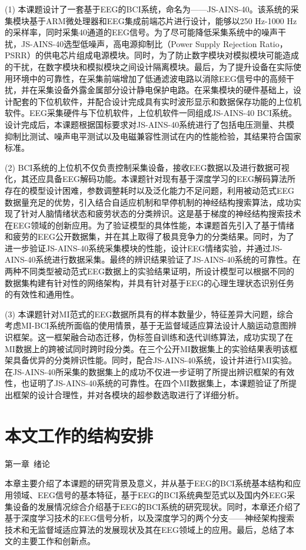 (1) 本课题设计了一套基于EEG的BCI系统，命名为——JS-AINS-40。该系统的采集模块基于ARM微处理器和EEG集成前端芯片进行设计，能够以250 Hz-1000 Hz的采样率，同时采集40通道的EEG信号。为了尽可能降低采集系统中的噪声干扰，JS-AINS-40选型低噪声，高电源抑制比（Power Supply Rejection Ratio，PSRR）的供电芯片组成电源模块。同时，为了防止数字模块对模拟模块可能造成的干扰，在数字模块和模拟模块之间设计隔离模块。最后，为了提升设备在实际使用环境中的可靠性，在采集前端增加了低通滤波电路以消除EEG信号中的高频干扰，并在采集设备外露金属部分设计静电保护电路。在采集模块的硬件基础上，设计配套的下位机软件，并配合设计完成具有实时波形显示和数据保存功能的上位机软件。EEG采集硬件与下位机软件，上位机软件一同组成JS-AINS-40 BCI系统。设计完成后，本课题根据国标要求对JS-AINS-40系统进行了包括电压测量、共模抑制比测试、噪声电平测试以及电磁兼容性测试在内的性能检验，其结果符合国家标准。

(2) BCI系统的上位机不仅负责控制采集设备，接收EEG数据以及进行数据可视化，其还应具备EEG解码功能。本课题针对现有基于深度学习的EEG解码算法所存在的模型设计困难，参数调整耗时以及泛化能力不足问题，利用被动范式EEG数据量充足的优势，引入结合自适应机制和早停机制的神经结构搜索算法，成功实现了针对人脑情绪状态和疲劳状态的分类辨识。这是基于梯度的神经结构搜索技术在EEG领域的创新应用。为了验证模型的具体性能，本课题首先引入了基于情绪和疲劳的EEG公开数据集，并在其上取得了极具竞争力的分类结果。同时，为了进一步验证JS-AINS-40系统采集模块的性能，设计EEG情绪实验，并通过JS-AINS-40系统进行数据采集。最终的辨识结果验证了JS-AINS-40系统的可靠性。在两种不同类型被动范式EEG数据上的实验结果证明，所设计模型可以根据不同的数据集构建有针对性的网络架构，并具有针对基于EEG的心理生理状态识别任务的有效性和通用性。

(3) 本课题针对MI范式的EEG数据所具有的样本数量少，特征差异大问题，综合考虑MI-BCI系统所面临的使用情景，基于无监督域适应算法设计人脑运动意图辨识框架。这一框架融合动态迁移，伪标签自训练和迭代训练算法，成功实现了在MI数据上的跨被试同时跨时段分类。在三个公开MI数据集上的实验结果表明该框架具备优异的分类辨识性能。同时，配合JS-AINS-40系统，设计并进行MI实验。在JS-AINS-40所采集的数据集上的成功不仅进一步证明了所提出辨识框架的有效性，也证明了JS-AINS-40系统的可靠性。在四个MI数据集上，本课题验证了所提出框架的设计合理性，并对各模块的超参数选取进行了详细分析。

\section{本文工作的结构安排}

第一章~绪论

本章主要介绍了本课题的研究背景及意义，并从基于EEG的BCI系统基本结构和应用领域、EEG信号的基本特征，基于EEG的BCI系统典型范式以及国内外EEG采集设备的发展情况综合介绍基于EEG的BCI系统的研究现状。同时，本章还介绍了基于深度学习技术的EEG信号分析，以及深度学习的两个分支——神经架构搜索技术和无监督域适应算法的发展现状及其在EEG领域上的应用。最后，总结了本文的主要工作和创新点。


